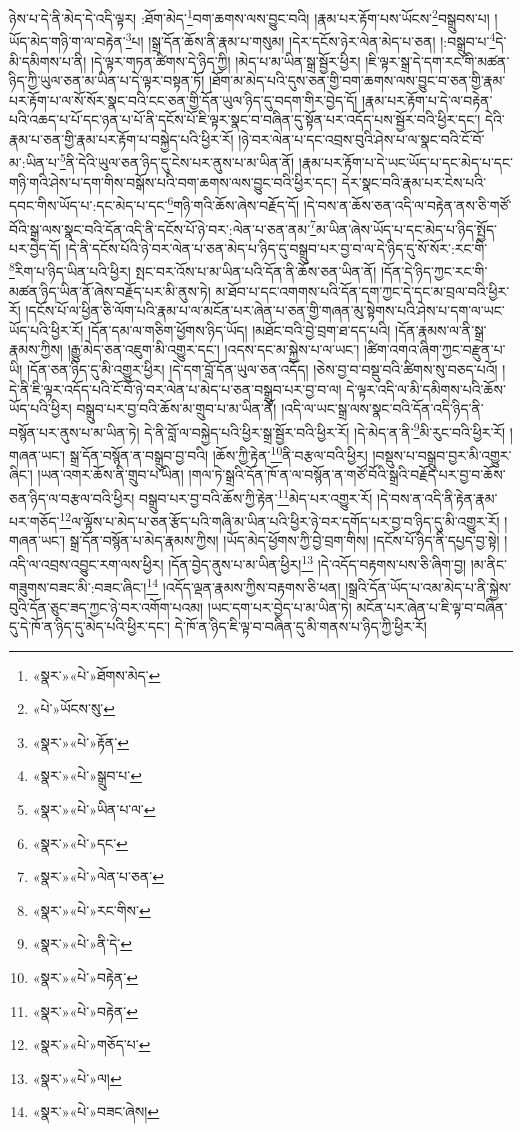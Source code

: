 ཉེས་པ་དེ་ནི་མེད་དེ་འདི་ལྟར། :ཐོག་མེད་\footnote{«སྣར་»«པེ་»ཐོགས་མེད་}བག་ཆགས་ལས་བྱུང་བའི། །རྣམ་པར་རྟོག་པས་ཡོངས་\footnote{«པེ་»ཡོངས་སུ་}བསྒྲུབས་པ། །ཡོད་མེད་གཉི་ག་ལ་བརྟེན་\footnote{«སྣར་»«པེ་»རྟོན་}པ། །སྒྲ་དོན་ཆོས་ནི་རྣམ་པ་གསུམ། །དེར་དངོས་ཉེར་ལེན་མེད་པ་ཅན། །:བསྒྲུབ་པ་\footnote{«སྣར་»«པེ་»སྒྲུབ་པ་}དེ་མི་དམིགས་པ་ནི། །དེ་ལྟར་གཏན་ཚིགས་དེ་ཉིད་ཀྱི། །མེད་པ་མ་ཡིན་སྒྲ་སྦྱོར་ཕྱིར། །ཇི་ལྟར་སྒྲ་དེ་དག་རང་གི་མཚན་ཉིད་ཀྱི་ཡུལ་ཅན་མ་ཡིན་པ་དེ་ལྟར་བསྟན་ཏོ། །ཐོག་མ་མེད་པའི་དུས་ཅན་གྱི་བག་ཆགས་ལས་བྱུང་བ་ཅན་གྱི་རྣམ་པར་རྟོག་པ་ལ་སོ་སོར་སྣང་བའི་ངང་ཅན་གྱི་དོན་ཡུལ་ཉིད་དུ་བདག་གིར་བྱེད་དོ། །རྣམ་པར་རྟོག་པ་དེ་ལ་བརྟེན་པའི་འཆད་པ་པོ་དང་ཉན་པ་པོ་ནི་དངོས་པོ་ཇི་ལྟར་སྣང་བ་བཞིན་དུ་སྟོན་པར་འདོད་པས་སྦྱོར་བའི་ཕྱིར་དང་། དེའི་རྣམ་པ་ཅན་གྱི་རྣམ་པར་རྟོག་པ་བསྐྱེད་པའི་ཕྱིར་རོ། །ཉེ་བར་ལེན་པ་དང་འབྲས་བུའི་ཤེས་པ་ལ་སྣང་བའི་ངོ་བོ་མ་:ཡིན་པ་\footnote{«སྣར་»«པེ་»ཡིན་པ་ལ་}ནི་དེའི་ཡུལ་ཅན་ཉིད་དུ་ངེས་པར་ནུས་པ་མ་ཡིན་ནོ། །རྣམ་པར་རྟོག་པ་དེ་ཡང་ཡོད་པ་དང་མེད་པ་དང་གཉི་གའི་ཤེས་པ་དག་གིས་བསྒོས་པའི་བག་ཆགས་ལས་བྱུང་བའི་ཕྱིར་དང་། དེར་སྣང་བའི་རྣམ་པར་ངེས་པའི་དབང་གིས་ཡོད་པ་:དང་མེད་པ་དང་\footnote{«སྣར་»«པེ་»དང་}གཉི་གའི་ཆོས་ཞེས་བརྗོད་དོ། །དེ་བས་ན་ཆོས་ཅན་འདི་ལ་བརྟེན་ནས་ཅི་གཙོ་བོའི་སྒྲ་ལས་སྣང་བའི་དོན་འདི་ནི་དངོས་པོ་ཉེ་བར་:ལེན་པ་ཅན་ནམ་\footnote{«སྣར་»«པེ་»ལེན་པ་ཅན་}མ་ཡིན་ཞེས་ཡོད་པ་དང་མེད་པ་ཉིད་སྤྱོད་པར་བྱེད་དོ། །དེ་ནི་དངོས་པོའི་ཉེ་བར་ལེན་པ་ཅན་མེད་པ་ཉིད་དུ་བསྒྲུབ་པར་བྱ་བ་ལ་དེ་ཉིད་དུ་སོ་སོར་:རང་གི་\footnote{«སྣར་»«པེ་»རང་གིས་}རིག་པ་ཉིད་ཡིན་པའི་ཕྱིར། སྤང་བར་འོས་པ་མ་ཡིན་པའི་དོན་ནི་ཆོས་ཅན་ཡིན་ནོ། །དོན་དེ་ཉིད་ཀྱང་རང་གི་མཚན་ཉིད་ཡིན་ནོ་ཞེས་བརྗོད་པར་མི་ནུས་ཏེ། མ་ཐོབ་པ་དང་འགགས་པའི་དོན་དག་ཀྱང་དེ་དང་མ་བྲལ་བའི་ཕྱིར་རོ། །དངོས་པོ་ལ་ཕྱིན་ཅི་ལོག་པའི་རྣམ་པ་ལ་མངོན་པར་ཞེན་པ་ཅན་གྱི་གཞན་མུ་སྟེགས་པའི་ཤེས་པ་དག་ལ་ཡང་ཡོད་པའི་ཕྱིར་རོ། །དོན་དམ་ལ་གཅིག་ཕྱོགས་ཉིད་ཡོད། །མཐོང་བའི་བྱེ་བྲག་ཐ་དད་པའི། །དོན་རྣམས་ལ་ནི་སྒྲ་རྣམས་ཀྱིས། །རྒྱུ་མེད་ཅན་འཇུག་མི་འགྱུར་དང་། །འདས་དང་མ་སྐྱེས་པ་ལ་ཡང་། །ཚིག་འགའ་ཞིག་ཀྱང་བརྫུན་པ་ཡི། །དོན་ཅན་ཉིད་དུ་མི་འགྱུར་ཕྱིར། །དེ་དག་བློ་དོན་ཡུལ་ཅན་འདོད། །ཅེས་བྱ་བ་བསྡུ་བའི་ཚིགས་སུ་བཅད་པའོ། །དེ་ནི་ཇི་ལྟར་འདོད་པའི་ངོ་བོ་ཉེ་བར་ལེན་པ་མེད་པ་ཅན་བསྒྲུབ་པར་བྱ་བ་ལ། དེ་ལྟར་འདི་ལ་མི་དམིགས་པའི་ཆོས་ཡོད་པའི་ཕྱིར། བསྒྲུབ་པར་བྱ་བའི་ཆོས་མ་གྲུབ་པ་མ་ཡིན་ནོ། །འདི་ལ་ཡང་སྒྲ་ལས་སྣང་བའི་དོན་འདི་ཉིད་ནི་བསྙོན་པར་ནུས་པ་མ་ཡིན་ཏེ། དེ་ནི་བློ་ལ་བསྐྱེད་པའི་ཕྱིར་སྒྲ་སྦྱོར་བའི་ཕྱིར་རོ། །དེ་མེད་ན་ནི་\footnote{«སྣར་»«པེ་»ནི་དེ་}མི་རུང་བའི་ཕྱིར་རོ། །གཞན་ཡང་། སྒྲ་དོན་བསྙོན་ན་བསྒྲུབ་བྱ་བའི། །ཆོས་ཀྱི་རྟེན་\footnote{«སྣར་»«པེ་»བརྟེན་}ནི་བརྩལ་བའི་ཕྱིར། །བསྡུས་པ་བསྒྲུབ་བྱར་མི་འགྱུར་ཞིང་། །ཡན་འགར་ཆོས་ནི་གྲུབ་པ་ཡིན། །གལ་ཏེ་སྒྲའི་དོན་ཁོ་ན་ལ་བསྙོན་ན་གཙོ་བོའི་སྒྲའི་བརྗོད་པར་བྱ་བ་ཆོས་ཅན་ཉིད་ལ་བརྩལ་བའི་ཕྱིར། བསྒྲུབ་པར་བྱ་བའི་ཆོས་ཀྱི་རྟེན་\footnote{«སྣར་»«པེ་»བརྟེན་}མེད་པར་འགྱུར་རོ། །དེ་བས་ན་འདི་ནི་རྟེན་རྣམ་པར་གཅོད་\footnote{«སྣར་»«པེ་»གཅོད་པ་}ལ་ལྟོས་པ་མེད་པ་ཅན་རྩོད་པའི་གཞི་མ་ཡིན་པའི་ཕྱིར་ཉེ་བར་དགོད་པར་བྱ་བ་ཉིད་དུ་མི་འགྱུར་རོ། །གཞན་ཡང་། སྒྲ་དོན་བསྙོན་པ་མེད་རྣམས་ཀྱིས། །ཡོད་མེད་ཕྱོགས་ཀྱི་བྱེ་བྲག་གིས། །དངོས་པོ་ཉིད་ནི་དཔྱད་བྱ་སྟེ། །འདི་ལ་འབྲས་འབྱུང་རག་ལས་ཕྱིར། །དོན་བྱེད་ནུས་པ་མ་ཡིན་ཕྱིར།\footnote{«སྣར་»«པེ་»ལ།} །དེ་འདོད་བརྟགས་པས་ཅི་ཞིག་བྱ། །མ་ནིང་གཟུགས་བཟང་མི་:བཟང་ཞིང་།\footnote{«སྣར་»«པེ་»བཟང་ཞེས།} །འདོད་ལྡན་རྣམས་ཀྱིས་བརྟགས་ཅི་ཕན། །སྒྲའི་དོན་ཡོད་པ་འམ་མེད་པ་ནི་སྐྱེས་བུའི་དོན་ཅུང་ཟད་ཀྱང་ཉེ་བར་འགོག་པའམ། །ཡང་དག་པར་བྱེད་པ་མ་ཡིན་ཏེ། མངོན་པར་ཞེན་པ་ཇི་ལྟ་བ་བཞིན་དུ་དེ་ཁོ་ན་ཉིད་དུ་མེད་པའི་ཕྱིར་དང་། དེ་ཁོ་ན་ཉིད་ཇི་ལྟ་བ་བཞིན་དུ་མི་གནས་པ་ཉིད་ཀྱི་ཕྱིར་རོ། 